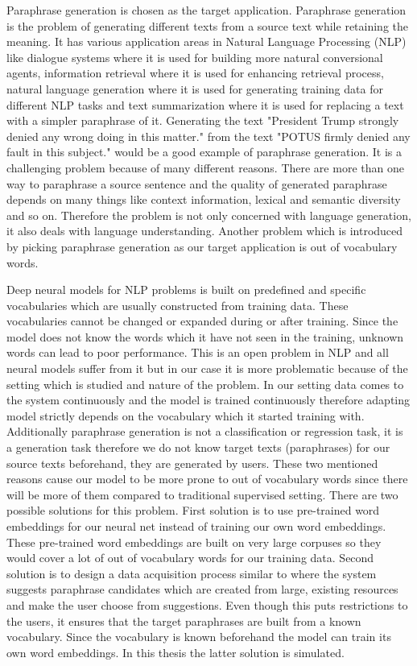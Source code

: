 Paraphrase generation is chosen as the target application. Paraphrase generation is the problem of generating different texts from a source text while retaining the meaning. It has various application areas in Natural Language Processing (NLP) like dialogue systems where it is used for building more natural conversional agents, information retrieval where it is used for enhancing retrieval process, natural language generation where it is used for generating training data for different NLP tasks and text summarization where it is used for replacing a text with a simpler paraphrase of it. Generating the text "President Trump strongly denied any wrong doing in this matter." from the text "POTUS firmly denied any fault in this subject." would be a good example of paraphrase generation. It is a challenging problem because of many different reasons. There are more than one way to paraphrase a source sentence and the quality of generated paraphrase depends on many things like context information, lexical and semantic diversity and so on. Therefore the problem is not only concerned with language generation, it also deals with language understanding. Another problem which is introduced by picking paraphrase generation as our target application is out of vocabulary words. 

Deep neural models for NLP problems is built on predefined and specific vocabularies which are usually constructed from training data. These vocabularies cannot be changed or expanded during or after training. Since the model does not know the words which it have not seen in the training, unknown words can lead to poor performance. This is an open problem in NLP and all neural models suffer from it but in our case it is more problematic because of the setting which is studied and nature of the problem. In our setting data comes to the system continuously and the model is trained continuously therefore adapting model strictly depends on the vocabulary which it started training with. Additionally paraphrase generation is not a classification or regression task, it is a generation task therefore we do not know target texts (paraphrases) for our source texts beforehand, they are generated by users. These two mentioned reasons cause our model to be more prone to out of vocabulary words since there will be more of them compared to traditional supervised setting. There are two possible solutions for this problem. First solution is to use pre-trained word embeddings for our neural net instead of training our own word embeddings. These pre-trained word embeddings are built on very large corpuses so they would cover a lot of out of vocabulary words for our training data. Second solution is to design a data acquisition process similar to \cite{par4sim} where the system suggests paraphrase candidates which are created from large, existing resources and make the user choose from suggestions. Even though this puts restrictions to the users, it ensures that the target paraphrases are built from a known vocabulary. Since the vocabulary is known beforehand the model can train its own word embeddings. In this thesis the latter solution is simulated. 

